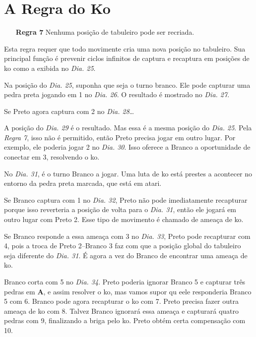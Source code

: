 \chapter{A Regra do Ko}

\begin{itemize}
  \item[\textbf{Regra 7}] Nenhuma posição de tabuleiro pode ser recriada.
\end{itemize}

Esta regra requer que todo movimente cria uma nova posição no tabuleiro. Sua principal função é prevenir ciclos infinitos de captura e recaptura em posições de ko como a exibida no \emph{Dia. 25}.


Na posição do \emph{Dia. 25}, suponha que seja o turno branco. Ele pode capturar uma pedra preta jogando em 1 no \emph{Dia. 26}. O resultado é mostrado no \emph{Dia. 27}.

Se Preto agora captura com 2 no \emph{Dia. 28}\ldots

A posição do \emph{Dia. 29} é o resultado. Mas essa é a mesma posição do \emph{Dia. 25}. Pela \emph{Regra 7}, isso não é permitido, então Preto precisa jogar em outro lugar. Por exemplo, ele poderia jogar 2 no \emph{Dia. 30}. Isso oferece a Branco a oportunidade de conectar em 3, resolvendo o ko.

No \emph{Dia. 31}, é o turno Branco a jogar. Uma luta de ko está prestes a acontecer no entorno da pedra preta marcada, que está em atari.

Se Branco captura com 1 no \emph{Dia. 32}, Preto não pode imediatamente recapturar porque isso reverteria a posição de volta para o \emph{Dia. 31}, então ele jogará em outro lugar com Preto 2. Esse tipo de movimento é chamado de ameaça de ko.

Se Branco responde a essa ameaça com 3 no \emph{Dia. 33}, Preto pode recapturar com 4, pois a troca de Preto 2--Branco 3 faz com que a posição global do tabuleiro seja diferente do \emph{Dia. 31}. É agora a vez do Branco de encontrar uma ameaça de ko.

Branco corta com 5 no \emph{Dia. 34}. Preto poderia ignorar Branco 5 e capturar três pedras em \textbf{A}, e assim  resolver o ko, mas vamos supor qu eele responderia Branco 5 com 6. Branco pode agora recapturar o ko com 7. Preto precisa fazer outra ameaça de ko com 8. Talvez Branco ignorará essa ameaça e capturará quatro pedras com 9, finalizando a briga pelo ko. Preto obtém certa compensação com 10.